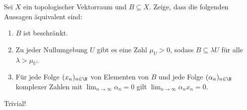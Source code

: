 \begin{exercise}

Sei $X$ ein topologischer Vektorraum und $B \subseteq X$.
Zeige, dass die folgenden Aussagen äquivalent sind:

\begin{enumerate}[label = (\roman*)]
  \item $B$ ist beschränkt.
  \item Zu jeder Nullumgebung $U$ gibt es eine Zahl $\mu_U > 0$, sodass $B \subseteq \lambda U$ für alle $\lambda > \mu_U$.
  \item Für jede Folge $(x_n)_{n \in \N}$ von Elementen von $B$ und jede Folge $(\alpha_n)_{n \in \N}$ komplexer Zahlen mit $\lim_{n \to \infty} \alpha_n = 0$ gilt $\lim_{n \to \infty} \alpha_n x_n = 0$.
\end{enumerate}

\end{exercise}

\begin{solution}

Trivial!

\end{solution}
